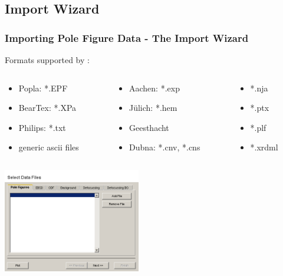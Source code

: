 \subsection*{Import Wizard}



\begin{frame}[fragile]
  \frametitle{Importing Pole Figure Data - The Import Wizard}

  Formats supported by \MTEX:

  \begin{columns}

    \begin{column}{4cm}
      \begin{itemize}
      \item Popla: *.EPF
      \item BearTex: *.XPa
      \item Philips: *.txt
      \item generic ascii files
      \end{itemize}
    \end{column}

    \begin{column}{4cm}
       \begin{itemize}
      \item Aachen: *.exp
      \item J\"ulich: *.hem
      \item Geesthacht
      \item Dubna: *.cnv, *.cns
      \end{itemize}
    \end{column}

    \begin{column}{3cm}
       \begin{itemize}
      \item *.nja
      \item *.ptx
      \item *.plf
      \item *.xrdml
      \end{itemize}
    \end{column}

  \end{columns}


  \centerline{\includegraphics[width=6cm]{pic/iw}}
\end{frame}

